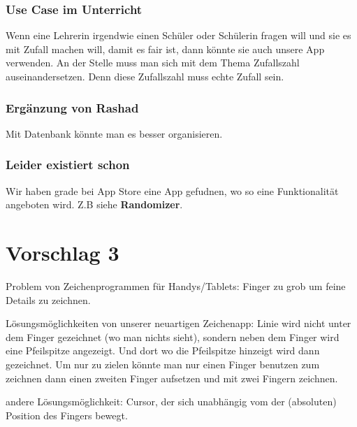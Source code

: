 \subsubsection{Use Case im Unterricht}
Wenn eine Lehrerin irgendwie einen Schüler oder Schülerin fragen will und sie es mit Zufall machen will, damit es fair ist, dann könnte sie auch unsere App verwenden. An der Stelle muss man sich mit dem Thema Zufallszahl auseinandersetzen. Denn diese Zufallszahl muss echte Zufall sein. 


\subsubsection{Ergänzung von Rashad}
Mit Datenbank könnte man es besser organisieren. 


\subsubsection{Leider existiert schon}
Wir haben grade bei App Store eine App gefudnen, wo so eine Funktionalität angeboten wird. Z.B siehe \textbf{Randomizer}. 



\section{Vorschlag 3}

Problem von Zeichenprogrammen für Handys/Tablets: Finger zu grob um feine Details zu zeichnen. 

Lösungsmöglichkeiten von unserer neuartigen Zeichenapp:
Linie wird nicht unter dem Finger gezeichnet (wo man nichts sieht), sondern neben dem Finger wird eine Pfeilspitze angezeigt. Und dort wo die Pfeilspitze hinzeigt wird dann gezeichnet.
Um nur zu zielen könnte man nur einen Finger benutzen zum zeichnen dann einen zweiten Finger aufsetzen und mit zwei Fingern zeichnen.

andere Lösungsmöglichkeit:
Cursor, der sich unabhängig vom der (absoluten) Position des Fingers bewegt.

